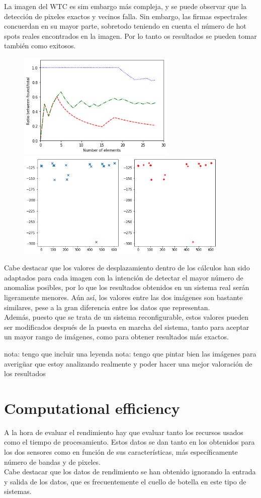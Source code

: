 La imagen del WTC es sim embargo más compleja, y se puede observar que la detección de pixeles exactos y vecinos falla. Sin embargo, las firmas espectrales concuerdan en su mayor parte, sobretodo teniendo en cuenta el número de hot spots reales encontrados en la imagen. Por lo tanto os resultados se pueden tomar también como exitosos.
\begin{figure}[!ht]
	\includegraphics[height=2.0in]{figures/wtc.png}
	\includegraphics[height=2.0in]{figures/wtc_res.png}
\end{figure}

Cabe destacar que los valores de desplazamiento dentro de los cálculos han sido adaptados para cada imagen con la intención de detectar el mayor número de anomalías posibles, por lo que los resultados obtenidos en un sistema real serán ligeramente menores. Aún así, los valores entre las dos imágenes son bastante similares, pese a la gran diferencia entre los datos que representan.
\\
Además, puesto que se trata de un sistema reconfigurable, estos valores pueden ser modificados después de la puesta en marcha del sistema, tanto para aceptar un mayor rango de imágenes, como para obtener resultados más exactos.

nota: tengo que incluir una leyenda
nota: tengo que pintar bien las imágenes para averigüar que estoy analizando realmente y poder hacer una mejor valoración de los resultados

\section{Computational efficiency}
A la hora de evaluar el rendimiento hay que evaluar tanto los recursos usados como el tiempo de procesamiento. Estos datos se dan tanto en los obtenidos para los dos sensores como en función de sus características, más específicamente número de bandas y de pixeles.
\\
Cabe destacar que los datos de rendimiento se han obtenido ignorando la entrada y salida de los datos, que es frecuentemente el cuello de botella en este tipo de sistemas.
\\

